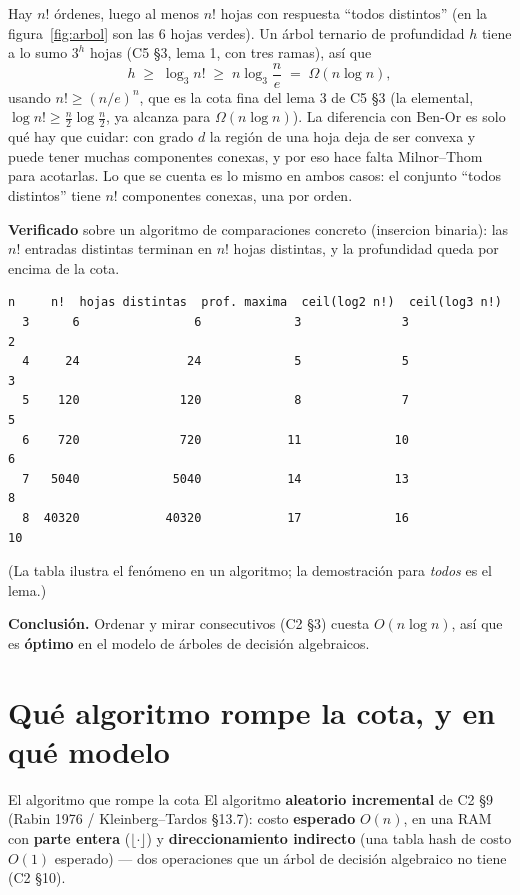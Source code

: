 \documentclass[11pt]{article}
\begin{document}
Hay $n!$ órdenes, luego al menos $n!$ hojas con respuesta ``todos distintos'' (en la figura~\ref{fig:arbol}
son las 6 hojas verdes). Un árbol ternario de
profundidad $h$ tiene a lo sumo $3^h$ hojas (C5 §3, lema 1, con tres ramas), así que
\[
  h\;\ge\;\log_3 n!\;\ge\;n\log_3\frac{n}{e}\;=\;\Omega(n\log n),
\]
usando $n!\ge(n/e)^n$, que es la cota fina del lema 3 de C5 §3 (la elemental, $\log n!\ge\frac n2\log\frac n2$,
ya alcanza para $\Omega(n\log n)$). La diferencia con Ben-Or es solo qué hay que cuidar: con grado $d$
la región de una hoja deja de ser convexa y puede tener muchas componentes conexas, y por eso hace falta
Milnor--Thom para acotarlas. Lo que se cuenta es lo mismo en ambos casos: el conjunto ``todos distintos''
tiene $n!$ componentes conexas, una por orden.

\textbf{Verificado} sobre un algoritmo de comparaciones concreto (insercion binaria): las $n!$ entradas
distintas terminan en $n!$ hojas distintas, y la profundidad queda por encima de la cota.
\begin{lstlisting}[style=salida,basicstyle=\ttfamily\footnotesize\color{black}]
  n     n!  hojas distintas  prof. maxima  ceil(log2 n!)  ceil(log3 n!)
  3      6                6             3              3              2
  4     24               24             5              5              3
  5    120              120             8              7              5
  6    720              720            11             10              6
  7   5040             5040            14             13              8
  8  40320            40320            17             16             10
\end{lstlisting}
(La tabla ilustra el fenómeno en un algoritmo; la demostración para \emph{todos} es el lema.)

\textbf{Conclusión.} Ordenar y mirar consecutivos (C2 §3) cuesta $O(n\log n)$, así que es \textbf{óptimo}
en el modelo de árboles de decisión algebraicos.

\section{Qué algoritmo rompe la cota, y en qué modelo}

\begin{resultado}{El algoritmo que rompe la cota}
El algoritmo \textbf{aleatorio incremental} de C2 §9 (Rabin 1976 / Kleinberg--Tardos §13.7): costo
\textbf{esperado} $O(n)$, en una RAM con \textbf{parte entera} ($\lfloor\cdot\rfloor$) y
\textbf{direccionamiento indirecto} (una tabla hash de costo $O(1)$ esperado) --- dos operaciones que un
árbol de decisión algebraico no tiene (C2 §10).
\end{resultado}
\end{document}
